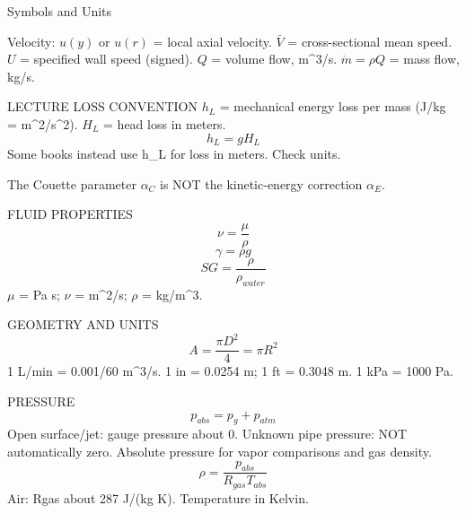 Symbols and Units

Velocity:
$u(y)$ or $u(r)$ = local axial velocity.
$\bar V$ = cross-sectional mean speed.
$U$ = specified wall speed (signed).
$Q$ = volume flow, m^3/s.
$\dot m=\rho Q$ = mass flow, kg/s.

LECTURE LOSS CONVENTION
$h_L$ = mechanical energy loss per mass (J/kg = m^2/s^2).
$H_L$ = head loss in meters.
$$h_L=gH_L$$
Some books instead use h_L for loss in meters. Check units.

The Couette parameter $\alpha_C$ is NOT the kinetic-energy correction $\alpha_E$.

FLUID PROPERTIES
$$\nu=\frac{\mu}{\rho}$$
$$\gamma=\rho g$$
$$SG=\frac{\rho}{\rho_{water}}$$
$\mu$ = Pa s; $\nu$ = m^2/s; $\rho$ = kg/m^3.

GEOMETRY AND UNITS
$$A=\frac{\pi D^2}{4}=\pi R^2$$
1 L/min = 0.001/60 m^3/s.
1 in = 0.0254 m; 1 ft = 0.3048 m.
1 kPa = 1000 Pa.

PRESSURE
$$p_{abs}=p_g+p_{atm}$$
Open surface/jet: gauge pressure about 0.
Unknown pipe pressure: NOT automatically zero.
Absolute pressure for vapor comparisons and gas density.
$$\rho=\frac{p_{abs}}{R_{gas}T_{abs}}$$
Air: Rgas about 287 J/(kg K).
Temperature in Kelvin.
